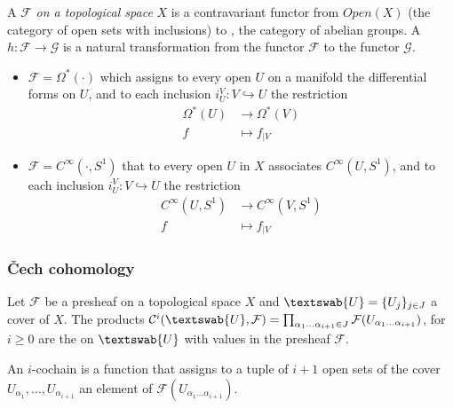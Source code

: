 \begin{definition}
A  $\mathcal{F}$ \emph{on a topological space} $X$ is a contravariant functor from $Open(X)$ (the category of open sets with inclusions) to , the category of abelian groups. A  $h:\mathcal{F}\rightarrow \mathcal{G}$ is a natural transformation from the functor $\mathcal{F}$ to the functor $\mathcal{G}$.
\end{definition}

\begin{example}
\begin{itemize}
\item $\mathcal{F}=\Omega^*(\cdot)$ which assigns to every open $U$ on a manifold the differential forms on $U$, and to each inclusion $i_U^V:V\hookrightarrow U$ the restriction
\begin{align*}
\Omega^*(U)&\rightarrow \Omega^*(V)\\
f&\mapsto f_{|V}
\end{align*}
\item $\mathcal{F}=C^\infty(\cdot,S^1)$ that to every open $U$ in $X$ associates $C^\infty(U,S^1)$, and to each inclusion $i_U^V:V\hookrightarrow U$ the restriction 
\begin{align*}
C^\infty(U,S^1)&\rightarrow C^\infty(V,S^1)\\
f&\mapsto f_{|V}
\end{align*}
\end{itemize}
\end{example}

\subsubsection{\v{C}ech cohomology}
                                                                                                                                
\begin{definition}
Let $\mathcal{F}$ be a presheaf on a topological space $X$ and $\textswab{U}=\{U_j\}_{j\in J}$ a cover of $X$. The products 
$\mathcal{C}^i(\textswab{U},\mathcal{F})=\prod_{\alpha_1\ldots \alpha_{i+1}\in J}\mathcal{F}(U_{\alpha_1\ldots \alpha_{i+1}})$, for $i\geq 0$ are the  on $\textswab{U}$ with values in the presheaf $\mathcal{F}$.
\end{definition}

An $i$-cochain is a function that assigns to a tuple of $i+1$ open sets of the cover $U_{\alpha_1},\ldots,U_{\alpha_{i+1}}$ an element of $\mathcal{F}(U_{\alpha_1\ldots \alpha_{i+1}})$.

